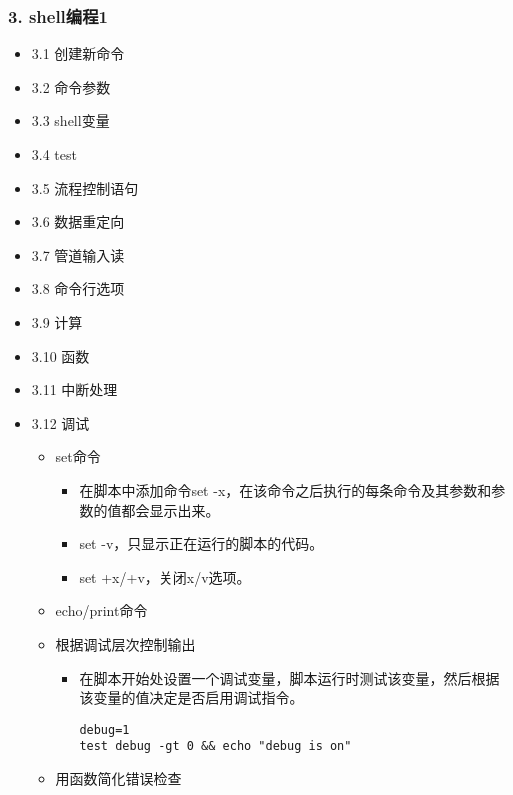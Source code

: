 \documentclass[bigger]{beamer}
\begin{document}
\begin{frame}[fragile]
\frametitle{3. shell编程1}
\label{sec-5-3}
\begin{itemize}

\item 3.1 创建新命令
\label{sec-5-3-1}%

\item 3.2 命令参数
\label{sec-5-3-2}%

\item 3.3 shell变量
\label{sec-5-3-3}%

\item 3.4 test
\label{sec-5-3-4}%

\item 3.5 流程控制语句
\label{sec-5-3-5}%

\item 3.6 数据重定向
\label{sec-5-3-6}%

\item 3.7 管道输入读
\label{sec-5-3-7}%

\item 3.8 命令行选项
\label{sec-5-3-8}%

\item 3.9 计算
\label{sec-5-3-9}%

\item 3.10 函数
\label{sec-5-3-10}%

\item 3.11 中断处理
\label{sec-5-3-11}%

\item 3.12 调试
\label{sec-5-3-12}%
\begin{itemize}
\item set命令
\begin{itemize}
\item 在脚本中添加命令set -x，在该命令之后执行的每条命令及其参数和参数的值都会显示出来。
\item set -v，只显示正在运行的脚本的代码。
\item set +x/+v，关闭x/v选项。
\end{itemize}
\item echo/print命令
\item 根据调试层次控制输出
\begin{itemize}
\item 在脚本开始处设置一个调试变量，脚本运行时测试该变量，然后根据该变量的值决定是否启用调试指令。

\begin{verbatim}
debug=1
test debug -gt 0 && echo "debug is on"
\end{verbatim}
\end{itemize}
\item 用函数简化错误检查


\end{itemize}
\end{itemize}
\end{frame}
\end{document}
